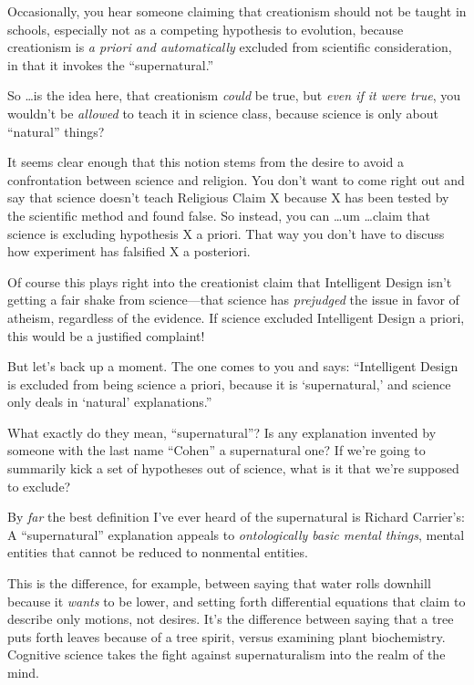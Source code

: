 {
 Occasionally, you hear someone claiming that creationism should
not be taught in schools, especially not as a competing hypothesis to
evolution, because creationism is \textit{a priori and automatically}
excluded from scientific consideration, in that it invokes the
``supernatural.'' }

{
 So \ldots is the idea here, that creationism \textit{could} be
true, but \textit{even if it were true}, you wouldn't
be \textit{allowed} to teach it in science class, because science is
only about ``natural'' things?}

{
 It seems clear enough that this notion stems from the desire to
avoid a confrontation between science and religion. You
don't want to come right out and say that science
doesn't teach Religious Claim X because X has been
tested by the scientific method and found false. So instead, you can
\ldots um \ldots claim that science is excluding hypothesis X a priori.
That way you don't have to discuss how experiment has
falsified X a posteriori.}

{
 Of course this plays right into the creationist claim that
Intelligent Design isn't getting a fair shake from
science---that science has \textit{prejudged} the issue in favor of
atheism, regardless of the evidence. If science excluded Intelligent
Design a priori, this would be a justified complaint!}

{
 But let's back up a moment. The one comes to you
and says: ``Intelligent Design is excluded from being
science a priori, because it is
`supernatural,' and science only deals
in `natural'
explanations.''}

{
 What exactly do they mean,
``supernatural''? Is any explanation
invented by someone with the last name
``Cohen'' a supernatural one? If
we're going to summarily kick a set of hypotheses out
of science, what is it that we're supposed to exclude?}

{
 By \textit{far} the best definition I've ever
heard of the supernatural is Richard Carrier's: A
``supernatural'' explanation appeals
to \textit{ontologically basic mental things}, mental entities that
cannot be reduced to nonmental entities.}

{
 This is the difference, for example, between saying that water
rolls downhill because it \textit{wants} to be lower, and setting forth
differential equations that claim to describe only motions, not
desires. It's the difference between saying that a tree
puts forth leaves because of a tree spirit, versus examining plant
biochemistry. Cognitive science takes the fight against supernaturalism
into the realm of the mind.}

